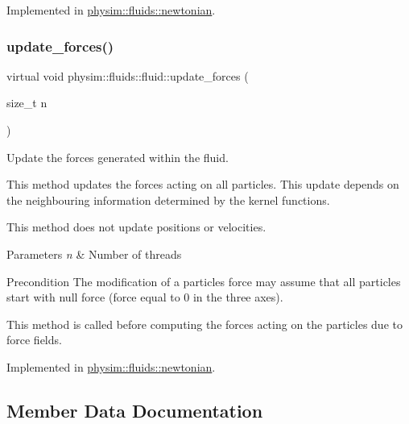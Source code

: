 Implemented in \hyperlink{classphysim_1_1fluids_1_1newtonian_accfe7d69d2d3985e8ec8c8179a6cf5ba}{physim\+::fluids\+::newtonian}.

\mbox{\label{classphysim_1_1fluids_1_1fluid_a08fe6b6111608b3deb3c3ddd84e1ab32}} 
\subsubsection{\texorpdfstring{update\+\_\+forces()}{update\_forces()}\hspace{0.1cm}{\footnotesize\ttfamily [2/2]}}
{\footnotesize\ttfamily virtual void physim\+::fluids\+::fluid\+::update\+\_\+forces (\begin{DoxyParamCaption}\item[{size\+\_\+t}]{n }\end{DoxyParamCaption})\hspace{0.3cm}{\ttfamily [pure virtual]}}



Update the forces generated within the fluid. 

This method updates the forces acting on all particles. This update depends on the neighbouring information determined by the kernel functions.

This method does not update positions or velocities.


\begin{DoxyParams}{Parameters}
{\em n} & Number of threads \\
\hline
\end{DoxyParams}
\begin{DoxyPrecond}{Precondition}
The modification of a particles\textquotesingle{} force may assume that all particles start with null force (force equal to 0 in the three axes). 

This method is called before computing the forces acting on the particles due to force fields. 
\end{DoxyPrecond}


Implemented in \hyperlink{classphysim_1_1fluids_1_1newtonian_a2ad3a26c489e0167f16cc4cd2ead981d}{physim\+::fluids\+::newtonian}.



\subsection{Member Data Documentation}
\mbox{\label{classphysim_1_1fluids_1_1fluid_a8774f815e80bb81ddc14890fee13bffc}} 
